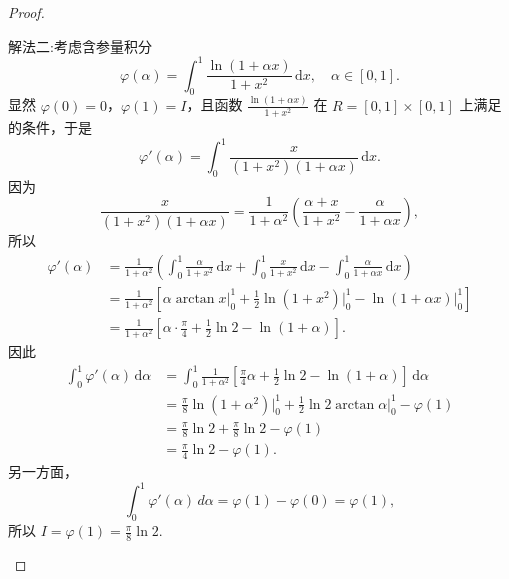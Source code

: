 \documentclass[../../main.tex]{subfiles}%
\begin{document}
\begin{proof}
\begin{enumerate}
{\color{blue}解法二:}考虑含参量积分
\[
\varphi(\alpha) = \int_{0}^{1} \frac{\ln(1 + \alpha x)}{1 + x^2} \, \mathrm{d}x, \quad \alpha \in [0,1].
\]
显然 \( \varphi(0) = 0 \)，\( \varphi(1) = I \)，且函数 \( \frac{\ln(1 + \alpha x)}{1 + x^2} \) 在 \( R = [0,1] \times [0,1] \) 上满足 的条件，于是
\[
\varphi'(\alpha) = \int_{0}^{1} \frac{x}{(1 + x^2)(1 + \alpha x)} \, \mathrm{d}x.
\]
因为
\[
\frac{x}{(1 + x^2)(1 + \alpha x)} = \frac{1}{1 + \alpha^2} \left( \frac{\alpha + x}{1 + x^2} - \frac{\alpha}{1 + \alpha x} \right),
\]
所以
\begin{align*}
\varphi' \left( \alpha \right) &=\frac{1}{1+\alpha ^2}\left( \int_0^1{\frac{\alpha}{1+x^2}\,\mathrm{d}x}+\int_0^1{\frac{x}{1+x^2}\,\mathrm{d}x}-\int_0^1{\frac{\alpha}{1+\alpha x}\,\mathrm{d}x} \right) 
\\
&=\frac{1}{1+\alpha ^2}\left[ \alpha \arctan  x\Big|_{0}^{1}+\frac{1}{2}\ln \left( 1+x^2 \right) \Big|_{0}^{1}-\ln \left( 1+\alpha x \right) \Big|_{0}^{1} \right] 
\\
&=\frac{1}{1+\alpha ^2}\left[ \alpha \cdot \frac{\pi}{4}+\frac{1}{2}\ln 2-\ln \left( 1+\alpha \right) \right] .
\end{align*}
因此
\begin{align*}
\int_0^1{\varphi' \left( \alpha \right) \,\mathrm{d}\alpha}&=\int_0^1{\frac{1}{1+\alpha ^2}\left[ \frac{\pi}{4}\alpha +\frac{1}{2}\ln 2-\ln \left( 1+\alpha \right) \right] \,\mathrm{d}\alpha}
\\
&=\frac{\pi}{8}\ln \left( 1+\alpha ^2 \right) \Big|_{0}^{1}+\frac{1}{2}\ln 2\arctan  \alpha \Big|_{0}^{1}-\varphi \left( 1 \right) 
\\
&=\frac{\pi}{8}\ln 2+\frac{\pi}{8}\ln 2-\varphi \left( 1 \right) 
\\
&=\frac{\pi}{4}\ln 2-\varphi \left( 1 \right) .
\end{align*}
另一方面，
\[
\int_{0}^{1} \varphi'(\alpha) \, d\alpha = \varphi(1) - \varphi(0) = \varphi(1),
\]
所以 \( I = \varphi(1) = \frac{\pi}{8} \ln 2 \).
\end{enumerate}
\end{proof}
\end{document}
